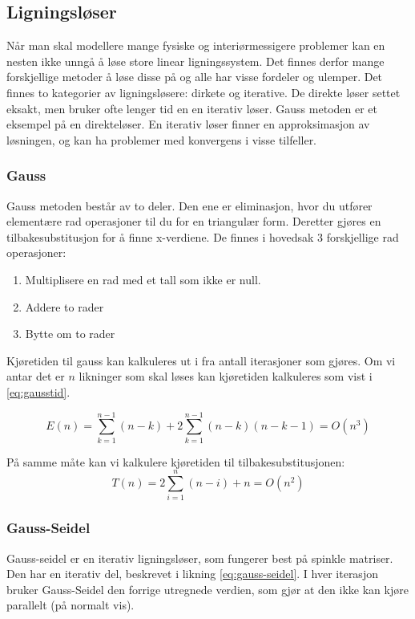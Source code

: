 \documentclass[10pt,a4paper, norsk]{article}
\begin{document}
\subsection{Ligningsløser}
Når man skal modellere mange fysiske og interiørmessigere problemer kan en nesten ikke unngå å løse store linear ligningssystem. Det finnes derfor mange forskjellige metoder å løse disse på og alle har visse fordeler og ulemper.
Det finnes to kategorier av ligningsløsere: dirkete og iterative. De direkte løser settet eksakt, men bruker ofte lenger tid en en iterativ løser. Gauss metoden er et eksempel på en direkteløser. En iterativ løser finner en approksimasjon av løsningen, og kan ha problemer med konvergens i visse tilfeller. 

\subsubsection{Gauss}

Gauss metoden består av to deler. Den ene er eliminasjon, hvor du utfører elementære rad operasjoner til du for en triangulær form. Deretter gjøres en tilbakesubstitusjon for å finne x-verdiene. De finnes i hovedsak 3 forskjellige rad operasjoner:
\begin{enumerate}
\item Multiplisere en rad med et tall som ikke er null.
\item Addere to rader
\item Bytte om to rader
\end{enumerate}

Kjøretiden til gauss kan kalkuleres ut i fra antall iterasjoner som gjøres. Om vi antar det er $n$ likninger som skal løses kan kjøretiden kalkuleres som vist i \eqref{eq:gausstid}.

\begin{equation} \label{eq:gausstid}
E(n) = \sum_{k=1}^{n-1} (n-k) + 2 \sum_{k=1}^{n-1} (n-k)(n-k-1) = O(n^3)
\end{equation}

På samme måte kan vi kalkulere kjøretiden til tilbakesubstitusjonen:
\begin{equation} \label{eq:gaussseideltid}
T(n) = 2\sum_{i=1}^{n} (n-i) + n = O(n^2)
\end{equation}


\subsubsection{Gauss-Seidel}
Gauss-seidel er en iterativ ligningsløser, som fungerer best på spinkle matriser. Den har en iterativ del, beskrevet i likning \ref{eq:gauss-seidel}. I hver iterasjon bruker Gauss-Seidel  den forrige utregnede verdien, som gjør at den ikke kan kjøre parallelt (på normalt vis). 
 
\end{document}
